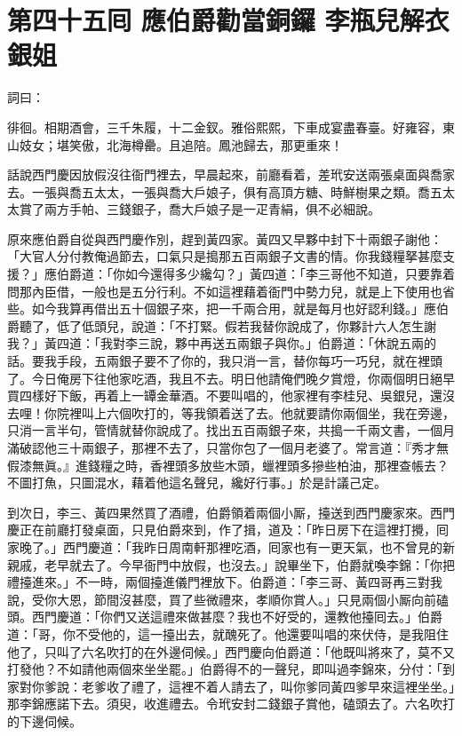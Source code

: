 
\chapter*{第四十五囘 應伯爵勸當銅鑼 李瓶兒解衣銀姐}


詞曰：

\begin{myquote}
徘徊。相期酒會，三千朱履，十二金釵。雅俗熙熙，下車成宴盡春臺。好雍容，東山妓女；堪笑傲，北海樽罍。且追陪。鳳池歸去，那更重來！

\end{myquote}

話說西門慶因放假沒往衙門裡去，早晨起來，前廳看着，差玳安送兩張桌面與喬家去。一張與喬五太太，一張與喬大戶娘子，俱有高頂方糖、時鮮樹果之類。喬五太太賞了兩方手帕、三錢銀子，喬大戶娘子是一疋青絹，俱不必細說。

原來應伯爵自從與西門慶作別，趕到黃四家。黃四又早夥中封下十兩銀子謝他：「大官人分付教俺過節去，口氣只是搗那五百兩銀子文書的情。你我錢糧拏甚麼支援？」應伯爵道：「你如今還得多少纔勾？」黃四道：「李三哥他不知道，只要靠着問那內臣借，一般也是五分行利。不如這裡藉着衙門中勢力兒，就是上下使用也省些。如今我算再借出五十個銀子來，把一千兩合用，就是每月也好認利錢。」應伯爵聽了，低了低頭兒，說道：「不打緊。假若我替你說成了，你夥計六人怎生謝我？」黃四道：「我對李三說，夥中再送五兩銀子與你。」伯爵道：「休說五兩的話。要我手段，五兩銀子要不了你的，我只消一言，替你每巧一巧兒，就在裡頭了。今日俺房下往他家吃酒，我且不去。明日他請俺們晚夕賞燈，你兩個明日絕早買四樣好下飯，再着上一罈金華酒。不要叫唱的，他家裡有李桂兒、吳銀兒，還沒去哩！你院裡叫上六個吹打的，等我領着送了去。他就要請你兩個坐，我在旁邊，只消一言半句，管情就替你說成了。找出五百兩銀子來，共搗一千兩文書，一個月滿破認他三十兩銀子，那裡不去了，只當你包了一個月老婆了。常言道：『秀才無假漆無眞。』{}進錢糧之時，香裡頭多放些木頭，蠟裡頭多摻些柏油，那裡查帳去？不圖打魚，只圖混水，藉着他這名聲兒，纔好行事。」於是計議己定。

到次日，李三、黃四果然買了酒禮，伯爵領着兩個小厮，擡送到西門慶家來。西門慶正在前廳打發桌面，只見伯爵來到，作了揖，道及：「昨日房下在這裡打攪，囘家晚了。」西門慶道：「我昨日周南軒那裡吃酒，囘家也有一更天氣，也不曾見的新親戚，老早就去了。今早衙門中放假，也沒去。」說畢坐下，伯爵就喚李錦：「你把禮擡進來。」不一時，兩個擡進儀門裡放下。伯爵道：「李三哥、黃四哥再三對我說，受你大恩，節間沒甚麼，買了些微禮來，孝順你賞人。」只見兩個小厮向前磕頭。西門慶道：「你們又送這禮來做甚麼？我也不好受的，還教他擡囘去。」伯爵道：「哥，你不受他的，這一擡出去，就醜死了。他還要叫唱的來伏侍，是我阻住他了，只叫了六名吹打的在外邊伺候。」西門慶向伯爵道：「他既叫將來了，莫不又打發他？不如請他兩個來坐坐罷。」伯爵得不的一聲兒，即叫過李錦來，分付：「到家對你爹說：老爹收了禮了，這裡不着人請去了，叫你爹同黃四爹早來這裡坐坐。」那李錦應諾下去。須臾，收進禮去。令玳安封二錢銀子賞他，磕頭去了。六名吹打的下邊伺候。

